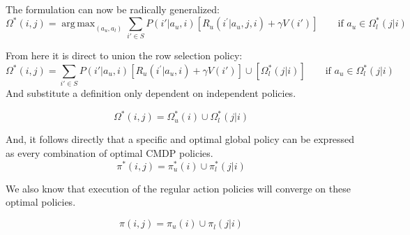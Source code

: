 \documentclass[compsoc,journal,letterpaper,10pt,draftclsnofoot,onecolumn]{IEEEtran}
\DeclareMathOperator*{\argmax}{arg\,max}
\begin{document}
The formulation can now be radically generalized:
\begin{equation}
\Omega^{*}\left( i,j \right) =  \argmax_{\left(a_{u},a_{l}\right)}
\sum_{i' \in S} 
P\left( i'|a_{u}, i \right)
\left\lbrack R_{u}\left(  i^{'}|a_{u}, j, i \right)+ \gamma V\left( i' \right) \right\rbrack
\qquad\textrm{if\ }
a_{u} \in\Omega_{l}^{*}\left( j|i \right)
\end{equation}

From here it is direct to union the row selection policy:
\begin{equation}
\Omega^{*}\left( i,j \right) =   \sum_{i' \in S}
P\left( i'|a_{u}, i \right)\left\lbrack R_{u}\left( i^{'}|a_{u}, i \right) + \gamma V\left( i' \right) \right\rbrack \cup \left\lbrack \Omega_{l}^{*}\left( j|i \right) \right\rbrack
\qquad\textrm{if\ }a_{u} \in\Omega_{l}^{*}\left( j|i \right)
\end{equation}
And substitute a definition only dependent on independent policies.
 
\begin{equation}
\Omega^{*}\left( i,j \right) = \Omega_{u}^{*}\left( i \right) \cup \Omega_{l}^{*}\left( j|i \right)
\end{equation}
 
And, it follows directly that a specific and optimal global policy can
be expressed as every combination of optimal CMDP policies.
\begin{equation}
\pi^{*}\left( i,j \right) = \pi_{u}^{*}\left( i \right) \cup \pi_{l}^{*}\left( j|i \right)
\end{equation}

We also know that execution of the regular action policies will converge
on these optimal policies.

\begin{equation}
\pi\left( i,j \right) = \pi_{u}^{\ }\left( i \right) \cup \pi_{l}^{\ }\left( j|i \right)
\end{equation}
\end{document}
